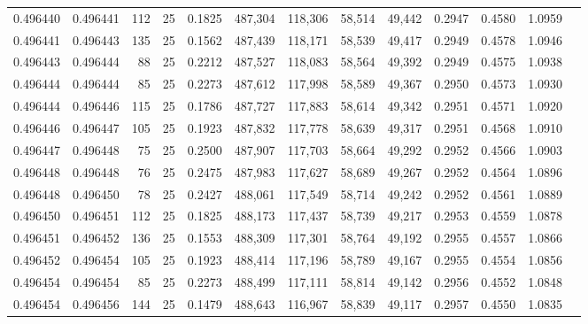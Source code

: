 \begin{tabular}{rrrrrrrrrrrrr}
0.496440 & 0.496441 &   112 &  25 &                                     0.1825 & 487,304 & 118,306 &  58,514 &  49,442 & 0.2947 & 0.4580 & 1.0959 \\
0.496441 & 0.496443 &   135 &  25 &                                     0.1562 & 487,439 & 118,171 &  58,539 &  49,417 & 0.2949 & 0.4578 & 1.0946 \\
0.496443 & 0.496444 &    88 &  25 &                                     0.2212 & 487,527 & 118,083 &  58,564 &  49,392 & 0.2949 & 0.4575 & 1.0938 \\
0.496444 & 0.496444 &    85 &  25 &                                     0.2273 & 487,612 & 117,998 &  58,589 &  49,367 & 0.2950 & 0.4573 & 1.0930 \\
0.496444 & 0.496446 &   115 &  25 &                                     0.1786 & 487,727 & 117,883 &  58,614 &  49,342 & 0.2951 & 0.4571 & 1.0920 \\
0.496446 & 0.496447 &   105 &  25 &                                     0.1923 & 487,832 & 117,778 &  58,639 &  49,317 & 0.2951 & 0.4568 & 1.0910 \\
0.496447 & 0.496448 &    75 &  25 &                                     0.2500 & 487,907 & 117,703 &  58,664 &  49,292 & 0.2952 & 0.4566 & 1.0903 \\
0.496448 & 0.496448 &    76 &  25 &                                     0.2475 & 487,983 & 117,627 &  58,689 &  49,267 & 0.2952 & 0.4564 & 1.0896 \\
0.496448 & 0.496450 &    78 &  25 &                                     0.2427 & 488,061 & 117,549 &  58,714 &  49,242 & 0.2952 & 0.4561 & 1.0889 \\
0.496450 & 0.496451 &   112 &  25 &                                     0.1825 & 488,173 & 117,437 &  58,739 &  49,217 & 0.2953 & 0.4559 & 1.0878 \\
0.496451 & 0.496452 &   136 &  25 &                                     0.1553 & 488,309 & 117,301 &  58,764 &  49,192 & 0.2955 & 0.4557 & 1.0866 \\
0.496452 & 0.496454 &   105 &  25 &                                     0.1923 & 488,414 & 117,196 &  58,789 &  49,167 & 0.2955 & 0.4554 & 1.0856 \\
0.496454 & 0.496454 &    85 &  25 &                                     0.2273 & 488,499 & 117,111 &  58,814 &  49,142 & 0.2956 & 0.4552 & 1.0848 \\
0.496454 & 0.496456 &   144 &  25 &                                     0.1479 & 488,643 & 116,967 &  58,839 &  49,117 & 0.2957 & 0.4550 & 1.0835 \\

\end{tabular}
